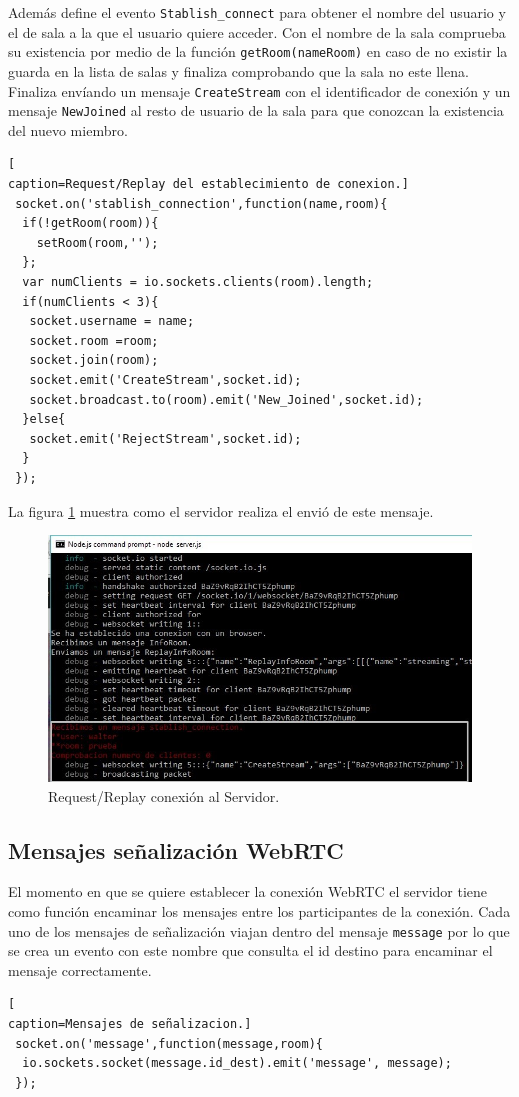 Además define el evento \texttt{Stablish\_connect} para obtener el nombre del usuario y el de sala a la que el usuario quiere acceder. Con el nombre de la sala comprueba su existencia por medio de la función \texttt{getRoom(nameRoom)} en caso de no existir la guarda en la lista de salas y finaliza comprobando que la sala no este llena. Finaliza envíando un mensaje \texttt{CreateStream} con el identificador de conexión y un mensaje \texttt{NewJoined} al resto de usuario de la sala para que conozcan la existencia del nuevo miembro.
\begin{lstlisting}[
caption=Request/Replay del establecimiento de conexion.]
 socket.on('stablish_connection',function(name,room){
  if(!getRoom(room)){
    setRoom(room,'');
  };
  var numClients = io.sockets.clients(room).length;
  if(numClients < 3){
   socket.username = name;
   socket.room =room;
   socket.join(room);
   socket.emit('CreateStream',socket.id);
   socket.broadcast.to(room).emit('New_Joined',socket.id);
  }else{
   socket.emit('RejectStream',socket.id);
  }
 });
\end{lstlisting}
La figura \ref{fig:EjecucionStablishConnection} muestra como el servidor realiza el envió de este mensaje.
\begin{figure}[!h]
\begin{center}
   \includegraphics[width=0.9\linewidth]{Figures/StablishConnectionServer}
	\decoRule
	\caption[Request/Replay conexión Servidor]{Request/Replay conexión al Servidor.}
\label{fig:EjecucionStablishConnection}
\end{center}
\end{figure}

\subsection*{Mensajes señalización WebRTC}
El momento en que se quiere establecer la conexión WebRTC el servidor tiene como función encaminar los mensajes entre los participantes de la conexión. Cada uno de los mensajes de señalización viajan dentro del mensaje \texttt{message} por lo que se crea un evento con este nombre que consulta el id destino para encaminar el mensaje correctamente.
\begin{lstlisting}[
caption=Mensajes de señalizacion.]
 socket.on('message',function(message,room){
  io.sockets.socket(message.id_dest).emit('message', message);
 });
\end{lstlisting}

